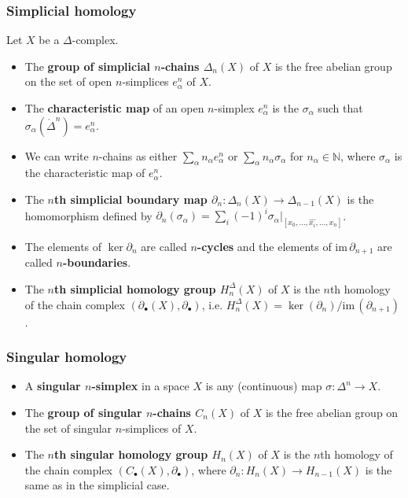 \documentclass[10pt]{article}
\newcommand{\nn}{\mathbb{N}}
\newcommand{\im}{\mathrm{im}\,}
\newcommand{\remove}[1]{\widehat{#1}}
\newcommand{\interior}[1]{\mathring{#1}}
\begin{document}
            \subsubsection{Simplicial homology}

                Let $X$ be a $\Delta$-complex.

                \begin{itemize}
                    \item The \textbf{group of simplicial $n$-chains $\Delta_n(X)$} of $X$ is the free abelian group on the set of open $n$-simplices $e_\alpha^n$ of $X$.
                    \item The \textbf{characteristic map} of an open $n$-simplex $e_\alpha^n$ is the $\sigma_\alpha$ such that $\sigma_\alpha(\interior{\Delta}^n)=e_\alpha^n$.
                    \item We can write $n$-chains as either $\sum_\alpha n_\alpha e_\alpha^n$ or $\sum_\alpha n_\alpha \sigma_\alpha$ for $n_\alpha\in\nn$, where $\sigma_\alpha$ is the characteristic map of $e_\alpha^n$.
                    \item The \textbf{$n$th simplicial boundary map $\partial_n\colon\Delta_n(X)\to\Delta_{n-1}(X)$} is the homomorphism defined by $\partial_n(\sigma_\alpha)=\sum_i(-1)^i\sigma_\alpha|_{[x_0,\ldots,\remove{x_i},\ldots,x_n]}$.
                    \item The elements of $\ker\partial_n$ are called \textbf{$n$-cycles} and the elements of $\im\partial_{n+1}$ are called \textbf{$n$-boundaries}.
                    \item The \textbf{$n$th simplicial homology group $H_n^\Delta(X)$} of $X$ is the $n$th homology of the chain complex $(\partial_\bullet(X),\partial_\bullet)$, i.e. $H_n^\Delta(X)=\ker(\partial_n)/\im(\partial_{n+1})$.
                \end{itemize}

            \subsubsection{Singular homology}

                \begin{itemize}
                    \item A \textbf{singular $n$-simplex} in a space $X$ is any (continuous) map $\sigma\colon\Delta^n\to X$.
                    \item The \textbf{group of singular $n$-chains $C_n(X)$} of $X$ is the free abelian group on the set of singular $n$-simplices of $X$.
                    \item The \textbf{$n$th singular homology group $H_n(X)$} of $X$ is the $n$th homology of the chain complex $(C_\bullet(X),\partial_\bullet)$, where $\partial_n\colon H_n(X)\to H_{n-1}(X)$ is the same as in the simplicial case.
                \end{itemize}
\end{document}

